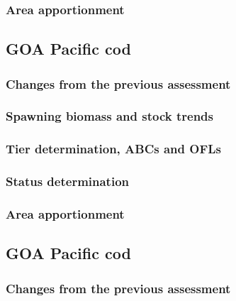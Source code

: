 \documentclass[]{tufte-handout}
\begin{document}
\hypertarget{area-apportionment-3}{%
\subsubsection{Area apportionment}\label{area-apportionment-3}}

\hypertarget{goa-pacific-cod-3}{%
\subsection{GOA Pacific cod}\label{goa-pacific-cod-3}}

\hypertarget{changes-from-the-previous-assessment-4}{%
\subsubsection{Changes from the previous
assessment}\label{changes-from-the-previous-assessment-4}}

\hypertarget{spawning-biomass-and-stock-trends-4}{%
\subsubsection{Spawning biomass and stock
trends}\label{spawning-biomass-and-stock-trends-4}}

\hypertarget{tier-determination-abcs-and-ofls-3}{%
\subsubsection{Tier determination, ABCs and
OFLs}\label{tier-determination-abcs-and-ofls-3}}

\hypertarget{status-determination-4}{%
\subsubsection{Status determination}\label{status-determination-4}}

\hypertarget{area-apportionment-4}{%
\subsubsection{Area apportionment}\label{area-apportionment-4}}

\hypertarget{goa-pacific-cod-4}{%
\subsection{GOA Pacific cod}\label{goa-pacific-cod-4}}

\hypertarget{changes-from-the-previous-assessment-5}{%
\subsubsection{Changes from the previous
assessment}\label{changes-from-the-previous-assessment-5}}
\end{document}
